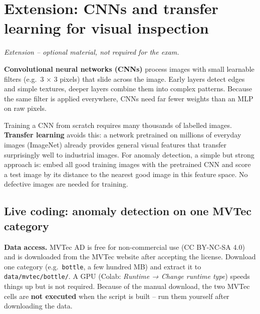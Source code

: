 \documentclass[
  letterpaper,
  DIV=11,
  numbers=noendperiod]{scrreprt}
\begin{document}
\section{Extension: CNNs and transfer learning for visual
inspection}\label{extension-cnns-and-transfer-learning-for-visual-inspection}

\emph{Extension -- optional material, not required for the exam.}

\textbf{Convolutional neural networks (CNNs)} process images with small
learnable filters (e.g.~3 × 3 pixels) that slide across the image. Early
layers detect edges and simple textures, deeper layers combine them into
complex patterns. Because the same filter is applied everywhere, CNNs
need far fewer weights than an MLP on raw pixels.

Training a CNN from scratch requires many thousands of labelled images.
\textbf{Transfer learning} avoids this: a network pretrained on millions
of everyday images (ImageNet) already provides general visual features
that transfer surprisingly well to industrial images. For anomaly
detection, a simple but strong approach is: embed all good training
images with the pretrained CNN and score a test image by its distance to
the nearest good image in this feature space. No defective images are
needed for training.

\subsection{Live coding: anomaly detection on one MVTec
category}\label{live-coding-anomaly-detection-on-one-mvtec-category}

\textbf{Data access.} MVTec AD is free for non-commercial use (CC
BY-NC-SA 4.0) and is downloaded from the MVTec website after accepting
the license. Download one category (e.g.~\texttt{bottle}, a few hundred
MB) and extract it to \texttt{data/mvtec/bottle/}. A GPU (Colab:
\emph{Runtime → Change runtime type}) speeds things up but is not
required. Because of the manual download, the two MVTec cells are
\textbf{not executed} when the script is built -- run them yourself
after downloading the data.
\end{document}
